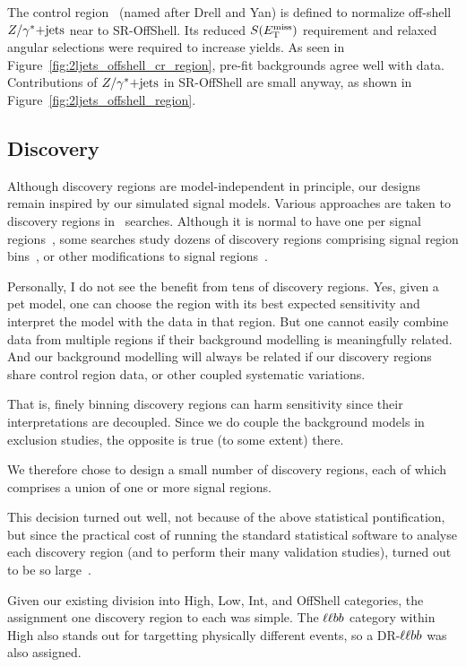 The control region \crdy\ (named after Drell and Yan) is defined to normalize
off-shell $Z/\gamma^*\mathrm{+jets}$ near to SR-OffShell.
Its reduced $S(E_\mathrm{T}^\mathrm{miss})$ requirement and relaxed angular selections were required
to increase yields.
As seen in Figure~\ref{fig:2ljets_offshell_cr_region}, pre-fit backgrounds
agree well with data.
Contributions of $Z/\gamma^*\mathrm{+jets}$ in SR-OffShell are small anyway, as shown in
Figure~\ref{fig:2ljets_offshell_region}.


\FloatBarrier
\subsection{Discovery}
\label{sec:2ljets_disco}

Although discovery regions are model-independent in principle, our designs
remain inspired by our simulated signal models.
Various approaches are taken to discovery regions in \atlas\ searches.
Although it is normal to have one per signal
regions~\cite{SUSY-2018-02},
some searches study
dozens of discovery regions comprising signal region bins~\cite{SUSY-2018-36},
or other modifications to signal
regions~\cite{atlas_susy_compressed_2l_2018_run2}.

Personally, I do not see the benefit from tens of discovery regions.
Yes, given a pet model, one can choose the region with its best expected
sensitivity and interpret the model with the data in that region.
But one cannot easily combine data from multiple regions if their background
modelling is meaningfully related.
And our background modelling will always be related if our discovery regions
share control region data, or other coupled systematic variations.

That is, finely binning discovery regions can harm sensitivity since their
interpretations are decoupled.
Since we do couple the background models in exclusion studies,
the opposite is true (to some extent) there.

We therefore chose to design a small number of discovery regions, each of which
comprises a union of one or more signal regions.

This decision turned out well, not because of the above statistical
pontification, but since the practical cost of running the standard statistical
software to analyse each discovery region (and to perform their many validation
studies), turned out to be so large~\cite{verkerke2003roofit}.

Given our existing division into High, Low, Int, and OffShell
categories, the assignment one discovery region to each was simple.
The $\ell\ell bb$ category within High also stands out for targetting physically
different events, so a DR-$\ell\ell bb$ was also assigned.

